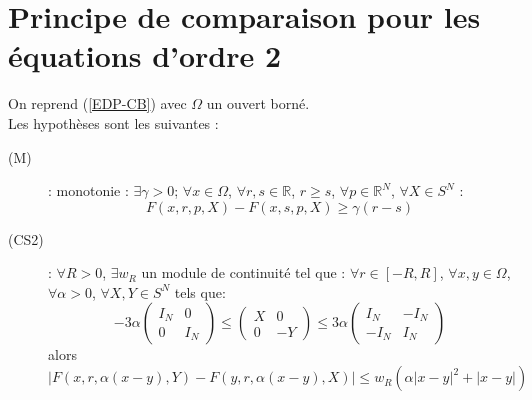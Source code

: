 \section{Principe de comparaison pour les équations d'ordre 2}
On reprend (\ref{EDP-CB}) avec $\Omega$ un ouvert borné.\\
Les hypothèses sont les suivantes : \begin{description}
	\item[\label{Mono2} (M)] : monotonie : $\exists\gamma>0$; $\forall x\in\Omega$, $\forall r,s\in\mathbb{R}$, $r\geq s$, $\forall p\in\mathbb{R}^N$, $\forall X\in S^N$ : \[F(x,r,p,X)-F(x,s,p,X)\geq \gamma(r-s)\]
	\item[\label{CS2} (CS2)] : $\forall R>0$, $\exists w_R$ un module de continuité tel que : $\forall r\in[-R,R]$, $\forall x,y\in\Omega$, $\forall\alpha>0$, $\forall X,Y\in S^N$ tels que: 
\begin{equation}\label{matCS2}
-3\alpha\begin{pmatrix} I_N & 0 \\ 0 & I_N \end{pmatrix} \leq \begin{pmatrix} X & 0 \\ 0 & -Y \end{pmatrix} \leq 3\alpha \begin{pmatrix} I_N & -I_N \\ -I_N & I_N \end{pmatrix}
\end{equation}
alors \[|F(x,r,\alpha(x-y),Y)-F(y,r,\alpha(x-y),X)|\leq w_R\left(\alpha|x-y|^2+|x-y|\right)\]
\end{description}



